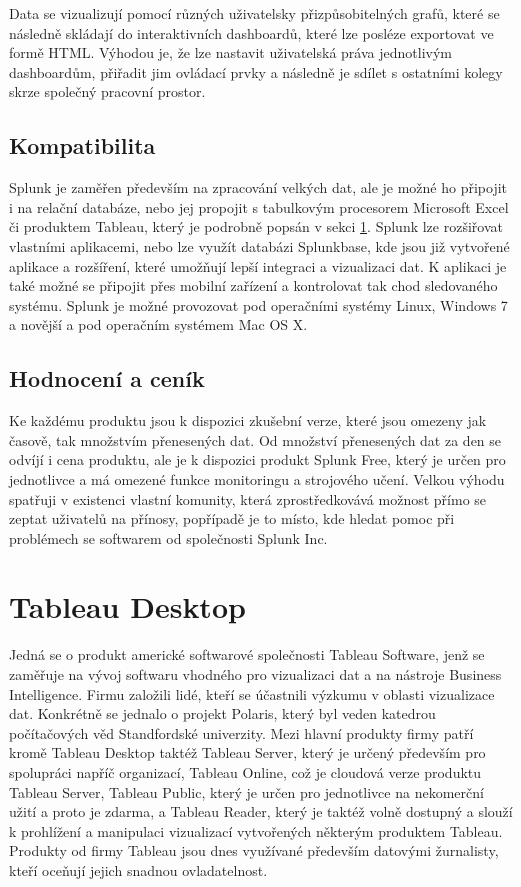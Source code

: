 \documentclass[czech,BP]{thesiskiv}
\begin{document}
Data se vizualizují pomocí různých uživatelsky přizpůsobitelných grafů, které se následně skládají do interaktivních dashboardů, které lze posléze exportovat ve formě HTML. Výhodou je, že lze nastavit uživatelská práva jednotlivým dashboardům, přiřadit jim ovládací prvky a následně je sdílet s ostatními kolegy skrze společný pracovní prostor.


\subsection{Kompatibilita}
Splunk je zaměřen především na zpracování velkých dat, ale je možné ho připojit i na relační databáze, nebo jej propojit s tabulkovým procesorem Microsoft Excel či produktem Tableau, který je podrobně popsán v sekci \ref{sec:Tableau}. Splunk lze rozšiřovat vlastními aplikacemi, nebo lze využít databázi Splunkbase, kde jsou již vytvořené aplikace a rozšíření, které umožňují lepší integraci a vizualizaci dat. K aplikaci je také možné se připojit přes mobilní zařízení a kontrolovat tak chod sledovaného systému. Splunk je možné provozovat pod operačními systémy Linux, Windows 7 a novější a pod operačním systémem Mac OS X. \cite{Splunk_a_kompatibilita}

\subsection{Hodnocení a ceník}
 Ke každému produktu jsou k dispozici zkušební verze, které jsou omezeny jak časově, tak množstvím přenesených dat. Od množství přenesených dat za den se odvíjí i cena produktu, ale je k dispozici produkt Splunk Free, který je určen pro jednotlivce a má omezené funkce monitoringu a strojového učení. Velkou výhodu spatřuji v existenci vlastní komunity, která zprostředkovává možnost přímo se zeptat uživatelů na přínosy, popřípadě je to místo, kde hledat pomoc při problémech se softwarem od společnosti Splunk Inc.
 
 
 \section{Tableau Desktop}
 \label{sec:Tableau}
 Jedná se o produkt americké softwarové společnosti Tableau Software, jenž se zaměřuje na vývoj softwaru vhodného pro vizualizaci dat a na nástroje Business Intelligence. Firmu založili lidé, kteří se účastnili výzkumu v oblasti vizualizace dat. Konkrétně se jednalo o projekt Polaris, který byl veden katedrou počítačových věd Standfordské univerzity.\cite{TableauHistory} Mezi hlavní produkty firmy patří kromě Tableau Desktop taktéž Tableau Server, který je určený především pro spolupráci napříč organizací, Tableau Online, což je cloudová verze produktu Tableau Server, Tableau Public, který je určen pro jednotlivce na nekomerční užití a proto je zdarma, a Tableau Reader, který je taktéž volně dostupný a slouží k prohlížení a manipulaci vizualizací vytvořených některým produktem Tableau. Produkty od firmy Tableau jsou dnes využívané především datovými žurnalisty, kteří oceňují jejich snadnou ovladatelnost.
 
\end{document}
